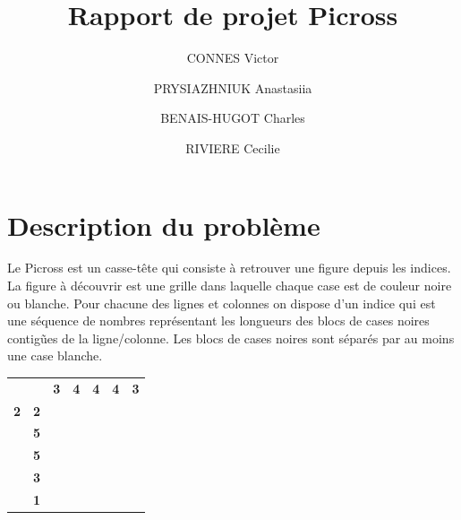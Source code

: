 \documentclass{article}
\begin{document}
\title{Rapport de projet Picross}
\author{CONNES Victor \and PRYSIAZHNIUK Anastasiia \and BENAIS-HUGOT Charles \and RIVIERE Cecilie}
\maketitle
\tableofcontents 
\newpage
\section{Description du problème}

Le Picross est un casse-tête qui consiste à retrouver une figure depuis les indices. La figure à découvrir est une grille dans laquelle chaque case est de couleur noire ou blanche. Pour chacune des lignes et colonnes on dispose d'un indice qui est une séquence de nombres représentant les longueurs des blocs de cases noires contigũes de la ligne/colonne. Les blocs de cases noires sont séparés par au moins une case blanche.

\begin{table}[h]
\centering
\begin{tabular}{ccccccc}
\textbf{}  & \textbf{}                       & \textbf{3}                     & \textbf{4}                     & \textbf{4}                     & \textbf{4}                     & \textbf{3}                     \\ \cline{3-7} 
\textbf{2} & \multicolumn{1}{c|}{\textbf{2}} & \multicolumn{1}{c|}{\textbf{}} & \multicolumn{1}{c|}{\textbf{}} & \multicolumn{1}{c|}{\textbf{}} & \multicolumn{1}{c|}{\textbf{}} & \multicolumn{1}{c|}{\textbf{}} \\ \cline{3-7} 
\textbf{}  & \multicolumn{1}{c|}{\textbf{5}} & \multicolumn{1}{c|}{\textbf{}} & \multicolumn{1}{c|}{\textbf{}} & \multicolumn{1}{c|}{\textbf{}} & \multicolumn{1}{c|}{\textbf{}} & \multicolumn{1}{c|}{\textbf{}} \\ \cline{3-7} 
\textbf{}  & \multicolumn{1}{c|}{\textbf{5}} & \multicolumn{1}{c|}{\textbf{}} & \multicolumn{1}{c|}{\textbf{}} & \multicolumn{1}{c|}{\textbf{}} & \multicolumn{1}{c|}{\textbf{}} & \multicolumn{1}{c|}{\textbf{}} \\ \cline{3-7} 
\textbf{}  & \multicolumn{1}{c|}{\textbf{3}} & \multicolumn{1}{c|}{\textbf{}} & \multicolumn{1}{c|}{\textbf{}} & \multicolumn{1}{c|}{\textbf{}} & \multicolumn{1}{c|}{\textbf{}} & \multicolumn{1}{c|}{\textbf{}} \\ \cline{3-7} 
\textbf{}  & \multicolumn{1}{c|}{\textbf{1}} & \multicolumn{1}{c|}{\textbf{}} & \multicolumn{1}{c|}{\textbf{}} & \multicolumn{1}{c|}{\textbf{}} & \multicolumn{1}{c|}{\textbf{}} & \multicolumn{1}{c|}{\textbf{}} \\ \cline{3-7} 
\end{tabular}
\end{table}
\end{document}
